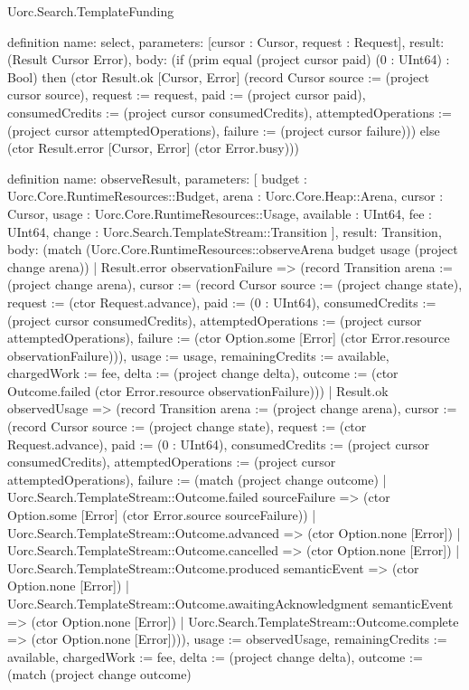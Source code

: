 \begin{lexlean}{Uorc.Search.TemplateFunding}
\begin{semanticmodule}
definition{
  name: select,
  parameters: [cursor : Cursor, request : Request],
  result: (Result Cursor Error),
  body: (if (prim equal (project cursor paid) (0 : UInt64) : Bool) then (ctor Result.ok [Cursor, Error] (record Cursor {source := (project cursor source), request := request, paid := (project cursor paid), consumedCredits := (project cursor consumedCredits), attemptedOperations := (project cursor attemptedOperations), failure := (project cursor failure)})) else (ctor Result.error [Cursor, Error] (ctor Error.busy)))
}

definition{
  name: observeResult,
  parameters: [
    budget : Uorc.Core.RuntimeResources::Budget,
    arena : Uorc.Core.Heap::Arena,
    cursor : Cursor,
    usage : Uorc.Core.RuntimeResources::Usage,
    available : UInt64,
    fee : UInt64,
    change : Uorc.Search.TemplateStream::Transition
  ],
  result: Transition,
  body: (match (Uorc.Core.RuntimeResources::observeArena budget usage (project change arena))
    | Result.error observationFailure => (record Transition {arena := (project change arena), cursor := (record Cursor {source := (project change state), request := (ctor Request.advance), paid := (0 : UInt64), consumedCredits := (project cursor consumedCredits), attemptedOperations := (project cursor attemptedOperations), failure := (ctor Option.some [Error] (ctor Error.resource observationFailure))}), usage := usage, remainingCredits := available, chargedWork := fee, delta := (project change delta), outcome := (ctor Outcome.failed (ctor Error.resource observationFailure))})
    | Result.ok observedUsage => (record Transition {arena := (project change arena), cursor := (record Cursor {source := (project change state), request := (ctor Request.advance), paid := (0 : UInt64), consumedCredits := (project cursor consumedCredits), attemptedOperations := (project cursor attemptedOperations), failure := (match (project change outcome)
      | Uorc.Search.TemplateStream::Outcome.failed sourceFailure => (ctor Option.some [Error] (ctor Error.source sourceFailure))
      | Uorc.Search.TemplateStream::Outcome.advanced => (ctor Option.none [Error])
      | Uorc.Search.TemplateStream::Outcome.cancelled => (ctor Option.none [Error])
      | Uorc.Search.TemplateStream::Outcome.produced semanticEvent => (ctor Option.none [Error])
      | Uorc.Search.TemplateStream::Outcome.awaitingAcknowledgment semanticEvent => (ctor Option.none [Error])
      | Uorc.Search.TemplateStream::Outcome.complete => (ctor Option.none [Error]))}), usage := observedUsage, remainingCredits := available, chargedWork := fee, delta := (project change delta), outcome := (match (project change outcome)
}}
\end{semanticmodule}
\end{lexlean}
